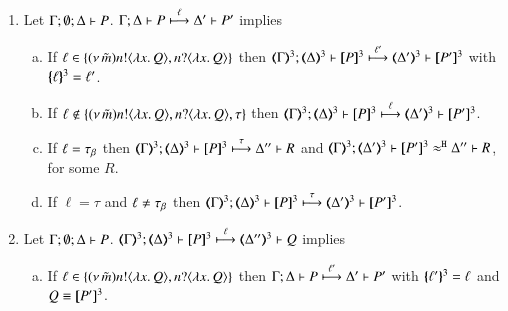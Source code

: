 \begin{proposition}\myrm
	\label{app:prop:op_corr_HOpp_to_HOp}
	\begin{enumerate}
		\item	Let $\Gamma; \emptyset; \Delta \vdash P$.
			$\Gamma; \Delta \vdash P \stackrel{\ell}{\longmapsto} \Delta' \vdash P'$ implies
%
			\begin{enumerate}[a)]
				\item	If $\ell \in \{(\nu\, \tilde{m}) n ! \langle \lambda x.\,Q \rangle, n ? \langle \lambda x.\,Q \rangle\}$ then
					$\horel{\tmap{\Gamma}{3}}{\tmap{\Delta}{3}}{\pmap{P}{3}}{\hby{\ell'}}
					{\tmap{\Delta'}{3}}{\pmap{P'}{3}}$ with $\{\!\!\{\ell\}\!\!\}^{3} = \ell'$.

%
%

				\item	If $\ell \notin \{(\nu\, \tilde{m}) n ! \langle \lambda x.\,Q \rangle, n ? \langle \lambda x.\,Q \rangle, \tau\}$ then
					$\horel{\tmap{\Gamma}{3}}{\tmap{\Delta}{3}}{\pmap{P}{3}}{\hby{\ell}}
					{\tmap{\Delta'}{3}}{\pmap{P'}{3}}$.

				\item	If $\ell = \tau_{\beta}$ then
					$\horel{\tmap{\Gamma}{3}}{\tmap{\Delta}{3}}{\pmap{P}{3}}{\hby{\tau}}
					{\Delta''}{R}$ and
					$\horel{\tmap{\Gamma}{3}}{\tmap{\Delta'}{3}}{\pmap{P'}{3}}{\hwb}{\Delta''}{R}$, for some $R$.

				\item	If $\ell = \tau$ and $\ell \not= \tau_{\beta}$ then %
					$\horel{\tmap{\Gamma}{3}}{\tmap{\Delta}{3}}{\pmap{P}{3}}{\hby{\tau}}
					{\tmap{\Delta'}{3}}{\pmap{P'}{3}}$.
			\end{enumerate}

		\item	Let $\Gamma; \emptyset; \Delta \vdash P$.
			$\horel{\tmap{\Gamma}{3}}{\tmap{\Delta}{3}}{\pmap{P}{3}}{\hby{\ell}}
			{\tmap{\Delta''}{3}}{Q}$ implies
%
			\begin{enumerate}[a)]
				\item	If $\ell \in \{(\nu\, \tilde{m}) n ! \langle \lambda x.\,Q \rangle, n ? \langle \lambda x.\,Q \rangle\}$
					then
					$\Gamma; \Delta \vdash P \stackrel{\ell'}{\longmapsto} \Delta' \vdash P'$
					with $\{\!\!\{\ell'\}\!\!\}^{3} = \ell$ and $Q \equiv [\!\![P']\!\!]^3$.


\end{enumerate}
\end{enumerate}
\end{proposition}
